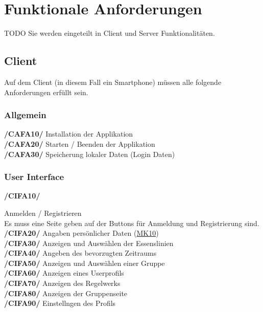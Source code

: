 \documentclass[a4paper]{scrreprt}
\begin{document}
\chapter{Funktionale Anforderungen}
TODO Sie werden eingeteilt in Client und Server Funktionalitäten.

\section{Client}
Auf dem Client (in diesem Fall ein Smartphone) müssen alle folgende Anforderungen erfüllt sein. 

\subsection{Allgemein}

\begin{addmargin}[25pt]{0pt} 
\textbf{/CAFA10/} Installation der Applikation \\
\textbf{/CAFA20/} Starten / Beenden der Applikation\\
\textbf{/CAFA30/} Speicherung lokaler Daten (Login Daten)\\
\end{addmargin}

\subsection{User Interface}

\begin{addmargin}[25pt]{0pt} 
\hypertarget{cifa10}{\textbf{/CIFA10/}} Anmelden / Registrieren \\
Es muss eine Seite geben auf der Buttons für Anmeldung und Registrierung sind.
\hypertarget{cifa20}{\textbf{/CIFA20/}} Angaben persönlicher Daten (\hyperlink{mk10}{MK10})\\
\hypertarget{cifa30}{\textbf{/CIFA30/}} Anzeigen und Auswählen der Essenslinien\\
\hypertarget{cifa40}{\textbf{/CIFA40/}} Angeben des bevorzugten Zeitraums\\
\hypertarget{cifa50}{\textbf{/CIFA50/}} Anzeigen und Auswählen einer Gruppe\\
\hypertarget{cifa60}{\textbf{/CIFA60/}} Anzeigen eines Userprofils\\
\hypertarget{cifa70}{\textbf{/CIFA70/}} Anzeigen des Regelwerks\\
\hypertarget{cifa80}{\textbf{/CIFA80/}} Anzeigen der Gruppenseite\\
\hypertarget{cifa90}{\textbf{/CIFA90/}} Einstellngen des Profils\\
\end{addmargin}
\end{document}
